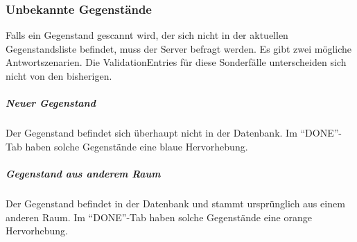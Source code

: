 \hypertarget{unbekannte-gegenstuxe4nde}{%
\subsubsection{Unbekannte Gegenstände}\label{unbekannte-gegenstuxe4nde}}

Falls ein Gegenstand gescannt wird, der sich nicht in der aktuellen
Gegenstandsliste befindet, muss der Server befragt werden. Es gibt zwei
mögliche Antwortszenarien. Die ValidationEntries für diese Sonderfälle
unterscheiden sich nicht von den bisherigen.

\hypertarget{neuer-gegenstand}{%
\subparagraph{Neuer Gegenstand}\label{neuer-gegenstand}}

Der Gegenstand befindet sich überhaupt nicht in der Datenbank. Im
``DONE''-Tab haben solche Gegenstände eine blaue Hervorhebung.

\hypertarget{gegenstand-aus-anderem-raum}{%
\subparagraph{Gegenstand aus anderem
Raum}\label{gegenstand-aus-anderem-raum}}

Der Gegenstand befindet in der Datenbank und stammt ursprünglich aus
einem anderen Raum. Im ``DONE''-Tab haben solche Gegenstände eine orange
Hervorhebung.
